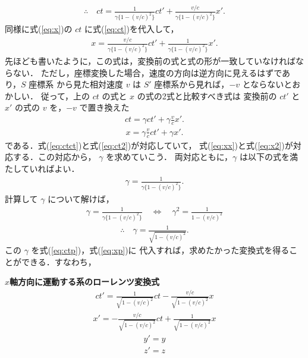 \begin{align}\label{eq:ctct}
\therefore\quad ct = \frac{1}{\gamma\{1-(v/c)^{2}\}}ct'+\frac{v/c}{\gamma\{1-(v/c)^{2}\}}x'.
\end{align}
同様に式(\ref{eq:x})の $ct$ に式(\ref{eq:ct})を代入して，
\begin{align}\label{eq:xx}
x = \frac{v/c}{\gamma \{ 1- (v/c)^{2}\}}ct'+\frac{1}{\gamma \{ 1- (v/c)^{2}\}}x'.
\end{align}
先ほども書いたように，この式は，変換前の式と式の形が一致していなければならない．
ただし，座標変換した場合，速度の方向は逆方向に見えるはずであり，$S$ 座標系
から見た相対速度 $v$ は $S'$ 座標系から見れば，$-v$ とならないとおかしい．
従って，上の $ct$ の式と $x$ の式の2式と比較すべき式は
変換前の $ct'$ と $x'$ の式の $v$ を，$-v$ で置き換えた
\begin{align}\label{eq:ct2}
ct=\gamma ct' +\gamma \frac{v}{c} x'.
\end{align}
\begin{align}\label{eq:x2}
x=\gamma \frac{v}{c} ct'+\gamma x'.
\end{align}
である．式(\ref{eq:ctct})と式(\ref{eq:ct2})が対応していて，
式(\ref{eq:xx})と式(\ref{eq:x2})が対応する．この対応から，
$\gamma$ を求めていこう．
両対応ともに，$\gamma$ は以下の式を満たしていればよい．
\begin{align}
\gamma = \frac{1}{\gamma \{ 1-(v/c)^{2} \} }.
\end{align}
計算して $\gamma$ について解けば，
\begin{align*}
\gamma = \frac{1}{\gamma \{ 1-(v/c)^{2} \} }
\quad\Leftrightarrow\quad
\gamma^{2} = \frac{1}{1-(v/c)^{2}}
\end{align*}
\begin{align}
\therefore\quad \gamma = \frac{1}{\sqrt{ 1-(v/c)^{2} }}.
\end{align}
この $\gamma$ を式(\ref{eq:ctp})，式(\ref{eq:xp})に
代入すれば，求めたかった変換式を得ることができる．すなわち，\\
\begin{itembox}[l]{\textbf{$x$軸方向に運動する系のローレンツ変換式}}
    \begin{align}
    ct'=\frac{1}{\sqrt{ 1-(v/c)^{2} }} ct -\frac{v/c}{\sqrt{ 1-(v/c)^{2} }} x
    \end{align}
    \begin{align}
    x'=-\frac{v/c}{\sqrt{ 1-(v/c)^{2} }}ct+\frac{1}{\sqrt{ 1-(v/c)^{2} }} x
    \end{align}
    \begin{align}
    y'=y
    \end{align}
    \begin{align}
    z'=z
    \end{align}
\end{itembox}\\
